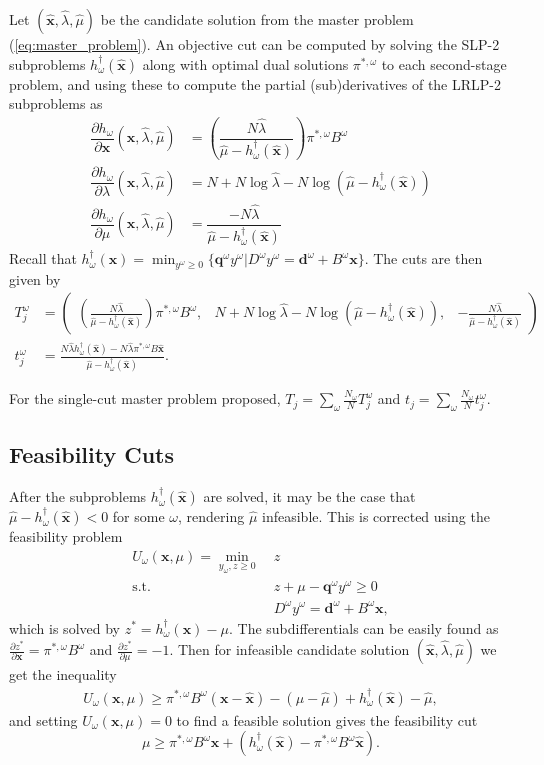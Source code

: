 \documentclass[11pt]{article}
\newcommand{\x}{\mathbf{x}}
\newcommand{\xh}{\hat{\x}}
\newcommand{\lh}{\hat{\lambda}}
\newcommand{\mh}{\hat{\mu}}
\newcommand{\q}{\mathbf{q}}
\renewcommand{\d}{\mathbf{d}}
\newcommand{\st}{\mbox{s.t.}}
\begin{document}
Let $(\xh,\lh,\mh)$ be the candidate solution from the master problem (\ref{eq:master_problem}).
An objective cut can be computed by solving the SLP-2 subproblems $h^\dagger_\omega(\xh)$ along with optimal dual solutions $\pi^{*,\omega}$ to each second-stage problem, and using these to compute the partial (sub)derivatives of the LRLP-2 subproblems as
\begin{align*}
	\dfrac{\partial h_\omega}{\partial \x}(\xh,\lh,\mh) & = \left(\dfrac{N\lh}{\mh - h^\dagger_\omega(\xh)}\right) \pi^{*,\omega} B^\omega \\
	\dfrac{\partial h_\omega}{\partial \lambda}(\xh,\lh,\mh) & = N + N\log\lh - N \log(\mh - h^\dagger_\omega(\xh)) \\
	\dfrac{\partial h_\omega}{\partial \mu}(\xh,\lh,\mh) & = \dfrac{-N\lh}{\mh - h^\dagger_\omega(\xh)}
\end{align*}
Recall that $h^\dagger_\omega(\x) = \min_{y^\omega \geq 0} \{\q^\omega y^\omega | D^\omega y^\omega = \d^\omega + B^\omega \x\}$.
The cuts are then given by
\begin{align*}
	T_j^\omega & = 
	\left( \begin{array}{ccc}
		\left(\frac{N\lh}{\mh - h^\dagger_\omega(\xh)}\right) \pi^{*,\omega} B^\omega, 
			 & N + N\log\lh - N\log(\mh - h^\dagger_\omega(\xh)), 
			 & -\frac{N\lh}{\mh - h^\dagger_\omega(\xh)}
	\end{array} \right) \\
	t_j^\omega & = \frac{N \lh h^\dagger_\omega(\xh) - N \lh \pi^{*,\omega}B\xh}{\mh - h^\dagger_\omega(\xh)}.
\end{align*}

For the single-cut master problem proposed, $T_j = \sum_\omega \frac{N_\omega}{N} T_j^\omega$ and $t_j = \sum_\omega \frac{N_\omega}{N} t_j^\omega$.

\subsection{Feasibility Cuts}
After the subproblems $h^\dagger_\omega(\xh)$ are solved, it may be the case that $\mh - h^\dagger_\omega(\xh) < 0$ for some $\omega$, rendering $\mh$ infeasible.
This is corrected using the feasibility problem
\begin{align*}
	U_\omega(\x,\mu) = \min_{y_\omega,z \geq 0} \ & z \\
	\st \ & z + \mu - \q^\omega y^\omega \geq 0 \\
	& D^\omega y^\omega = \d^\omega + B^\omega \x,
\end{align*}
which is solved by $z^* = h^\dagger_\omega(\x) - \mu$.
The subdifferentials can be easily found as $\frac{\partial z^*}{\partial \x} = \pi^{*,\omega} B^\omega$ and $\frac{\partial z^*}{\partial \mu} = -1$.
Then for infeasible candidate solution $(\xh,\lh,\mh)$ we get the inequality
\begin{align*}
	U_\omega(\x,\mu) \geq \pi^{*,\omega}B^\omega(\x-\xh) - (\mu -\mh) + h^\dagger_\omega(\xh) - \mh,
\end{align*}
and setting $U_\omega(\x,\mu) = 0$ to find a feasible solution gives the feasibility cut
\[
	\mu \geq \pi^{*,\omega}B^\omega \x + (h^\dagger_\omega(\xh) - \pi^{*,\omega}B^\omega\xh).
\]
\end{document}
